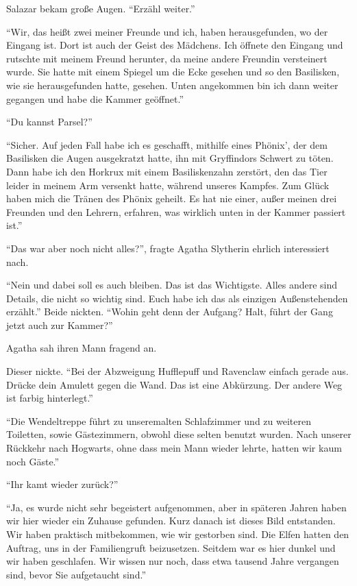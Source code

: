 Salazar bekam große Augen. \enquote{Erzähl weiter.}

\enquote{Wir, das heißt zwei meiner Freunde und ich, haben herausgefunden, wo der Eingang ist. Dort ist auch der Geist des Mädchens. Ich öffnete den Eingang und rutschte mit meinem Freund herunter, da meine andere Freundin versteinert wurde. Sie hatte mit einem Spiegel um die Ecke gesehen und so den Basilisken, wie sie herausgefunden hatte, gesehen. Unten angekommen bin ich dann weiter gegangen und habe die Kammer geöffnet.}

\enquote{Du kannst Parsel?}

\enquote{Sicher. Auf jeden Fall habe ich es geschafft, mithilfe eines Phönix’, der dem Basilisken die Augen ausgekratzt hatte, ihn mit Gryffindors Schwert zu töten. Dann habe ich den Horkrux mit einem Basiliskenzahn zerstört, den das Tier leider in meinem Arm versenkt hatte, während unseres Kampfes. Zum Glück haben mich die Tränen des Phönix geheilt. Es hat nie einer, außer meinen drei Freunden und den Lehrern, erfahren, was wirklich unten in der Kammer passiert ist.}

\enquote{Das war aber noch nicht alles?}, fragte Agatha Slytherin ehrlich interessiert nach.

\enquote{Nein und dabei soll es auch bleiben. Das ist das Wichtigste. Alles andere sind Details, die nicht so wichtig sind. Euch habe ich das als einzigen Außenstehenden erzählt.} Beide nickten. \enquote{Wohin geht denn der Aufgang? \gst Halt, führt der Gang jetzt auch zur Kammer?}

Agatha sah ihren Mann fragend an.

Dieser nickte. \enquote{Bei der Abzweigung Hufflepuff und Ravenclaw einfach gerade aus. Drücke dein Amulett gegen die Wand. Das ist eine Abkürzung. Der andere Weg ist farbig hinterlegt.}

\enquote{Die Wendeltreppe führt zu unserem\abs alten Schlafzimmer und zu weiteren Toiletten, sowie Gästezimmern, obwohl diese selten benutzt wurden. Nach unserer Rückkehr nach Hogwarts, ohne dass mein Mann wieder lehrte, hatten wir kaum noch Gäste.}

\enquote{Ihr kamt wieder zurück?}

\enquote{Ja, es wurde nicht sehr begeistert aufgenommen, aber in späteren Jahren haben wir hier wieder ein Zuhause gefunden. Kurz danach ist dieses Bild entstanden. Wir haben praktisch mitbekommen, wie wir gestorben sind. Die Elfen hatten den Auftrag, uns in der Familiengruft beizusetzen. Seitdem war es hier dunkel und wir haben geschlafen. Wir wissen nur noch, dass etwa tausend Jahre vergangen sind, bevor Sie aufgetaucht sind.}

